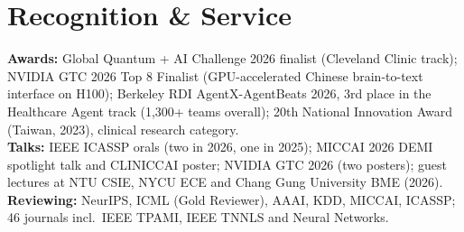 \documentclass[letterpaper,10pt]{article}
\newif\ifindustry
\newcommand{\resumeSubHeadingListStart}{\begin{itemize}[leftmargin=0.15in, label={}]}
\newcommand{\resumeSubHeadingListEnd}{\end{itemize}}
\begin{document}
\fi

\ifindustry
\section{Recognition \& Service}
    \vspace{2pt}
  \resumeSubHeadingListStart
    \small{\item{
    \textbf{Awards:} Global Quantum + AI Challenge 2026 finalist (Cleveland Clinic track); NVIDIA GTC 2026 Top 8 Finalist (GPU-accelerated Chinese brain-to-text interface on H100); Berkeley RDI AgentX-AgentBeats 2026, 3rd place in the Healthcare Agent track (1,300+ teams overall); 20th National Innovation Award (Taiwan, 2023), clinical research category. \\ \vspace{1pt}
    \textbf{Talks:} IEEE ICASSP orals (two in 2026, one in 2025); MICCAI 2026 DEMI spotlight talk and CLINICCAI poster; NVIDIA GTC 2026 (two posters); guest lectures at NTU CSIE, NYCU ECE and Chang Gung University BME (2026). \\ \vspace{1pt}
    \textbf{Reviewing:} NeurIPS, ICML (Gold Reviewer), AAAI, KDD, MICCAI, ICASSP; 46 journals incl.\ IEEE TPAMI, IEEE TNNLS and Neural Networks.
    }}
  \resumeSubHeadingListEnd

\else
\end{document}
